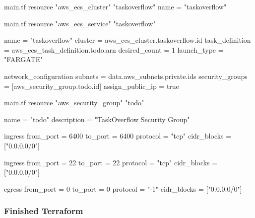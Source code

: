 \documentclass{csse4400}
\begin{document}
\begin{code}[language=terraform,numbers=none]{main.tf}
  resource "aws_ecs_cluster" "taskoverflow" {
    name = "taskoverflow"
  }
\end{code}

\begin{code}[language=terraform,numbers=none]{main.tf}
  resource "aws_ecs_service" "taskoverflow" {
    name            = "taskoverflow"
    cluster         = aws_ecs_cluster.taskoverflow.id
    task_definition = aws_ecs_task_definition.todo.arn
    desired_count   = 1
    launch_type     = "FARGATE"
  
    network_configuration {
      subnets             = data.aws_subnets.private.ids
      security_groups     = [aws_security_group.todo.id]
      assign_public_ip    = true
    }
  }
\end{code}

\begin{code}[language=terraform,numbers=none]{main.tf}
  resource "aws_security_group" "todo" {
    name = "todo"
    description = "TaskOverflow Security Group"
  
    ingress {
      from_port = 6400
      to_port = 6400
      protocol = "tcp"
      cidr_blocks = ["0.0.0.0/0"]
    }
  
    ingress {
      from_port = 22
      to_port = 22
      protocol = "tcp"
      cidr_blocks = ["0.0.0.0/0"]
    }
  
    egress {
      from_port = 0
      to_port = 0
      protocol = "-1"
      cidr_blocks = ["0.0.0.0/0"]
    }
  }
\end{code}

\subsubsection{Finished Terraform}
\end{document}

